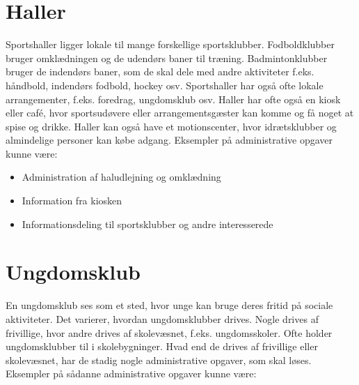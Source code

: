 


\section{Haller}

Sportshaller ligger lokale til mange forskellige sportsklubber.
Fodboldklubber bruger omklædningen og de udendørs baner til træning. 
Badmintonklubber bruger de indendørs baner, som de skal dele med andre aktiviteter f.eks. håndbold, indendørs fodbold, hockey osv.
Sportshaller har også ofte lokale arrangementer, f.eks. foredrag, ungdomsklub osv.
Haller har ofte også en kiosk eller café, hvor sportsudøvere eller arrangementsgæster kan komme og få noget at spise og drikke. 
Haller kan også have et motionscenter, hvor idrætsklubber og almindelige personer kan købe adgang\citep{spt_hal}. 
Eksempler på administrative opgaver kunne være:

\begin{itemize}
  \item Administration af haludlejning og omklædning 
  \item Information fra kiosken
  \item Informationsdeling til sportsklubber og andre interesserede
\end{itemize}


\section{Ungdomsklub}

En ungdomsklub ses som et sted, hvor unge kan bruge deres fritid på sociale aktiviteter.
Det varierer, hvordan ungdomsklubber drives. 
Nogle drives af frivillige, hvor andre drives af skolevæsnet, f.eks. ungdomsskoler\citep{ung1}.
Ofte holder ungdomsklubber til i skolebygninger. 
Hvad end de drives af frivillige eller skolevæsnet, har de stadig nogle administrative opgaver, som skal løses. 
Eksempler på sådanne administrative opgaver kunne være:

